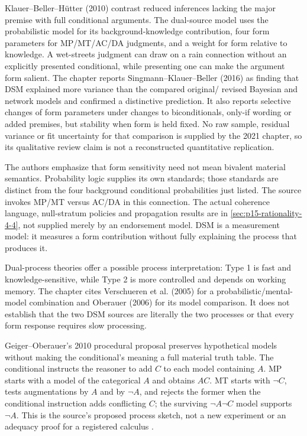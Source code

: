 Klauer--Beller--H\"utter (2010) contrast reduced inferences lacking the
major premise with full conditional arguments. The dual-source model uses
the probabilistic model for its background-knowledge contribution, four
form parameters for MP/MT/AC/DA judgments, and a weight for form relative
to knowledge. A wet-streets judgment can draw on a rain connection without
an explicitly presented conditional, while presenting one can make the
argument form salient. The chapter reports Singmann--Klauer--Beller (2016)
as finding that DSM explained more variance than the compared original/
revised Bayesian and network models and confirmed a distinctive prediction.
It also reports selective changes of form parameters under changes to
biconditionals, only-if wording or added premises, but stability when
form is held fixed. No raw sample, residual variance or fit uncertainty
for that comparison is supplied by the 2021 chapter, so its qualitative
review claim is not a reconstructed quantitative replication.

The authors emphasize that form sensitivity need not mean bivalent material
semantics. Probability logic supplies its own standards; those standards
are distinct from the four background conditional probabilities just listed.
The source invokes MP/MT versus AC/DA in this connection. The actual
coherence language, null-stratum policies and propagation results are in
\cref{sec:p15-rationality-4-4}, not supplied merely by an endorsement model.
DSM is a measurement model: it measures a form contribution without fully
explaining the process that produces it.

Dual-process theories offer a possible process interpretation: Type 1 is
fast and knowledge-sensitive, while Type 2 is more controlled and depends
on working memory. The chapter cites Verschueren et al. (2005) for a
probabilistic/mental-model combination and Oberauer (2006) for its model
comparison. It does not establish that the two DSM sources are literally
the two processes or that every form response requires slow processing.

Geiger--Oberauer's 2010 procedural proposal preserves hypothetical models
without making the conditional's meaning a full material truth table.
The conditional instructs the reasoner to add \(C\) to each model
containing \(A\). MP starts with a model of the categorical \(A\)
and obtains \(A C\). MT starts with \(\neg C\), tests augmentations
by \(A\) and by \(\neg A\), and rejects the former when the
conditional instruction adds conflicting \(C\); the surviving
\(\neg A\neg C\) model supports \(\neg A\). This is the
source's proposed process sketch, not a new experiment or an adequacy
proof for a registered calculus
\cite[pp.~300--302]{OberauerPessach2021ProbabilitiesConditionals}.

